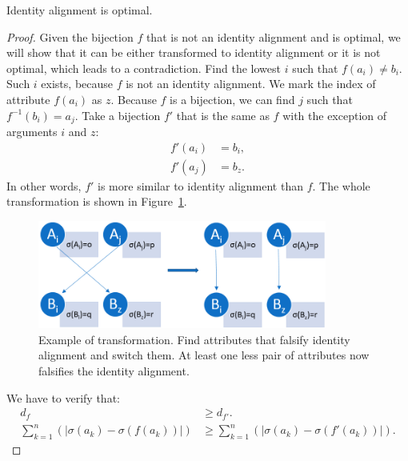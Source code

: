 \begin{theorem}
\label{mainproof}
Identity alignment is optimal.
\end{theorem}
\begin{proof}
Given the bijection $f$ that is not an identity alignment and is optimal, we will show that it can be either transformed to identity alignment or it is not optimal, which leads to a contradiction. Find the lowest $i$ such that $f(a_i)\neq b_i $. Such $i$ exists, because $f$ is not an identity alignment. We mark the index of attribute $f(a_i)$ as $z$. Because $f$ is a bijection, we can find $j$ such that $f^{-1}(b_i)=a_j$. Take a bijection $f'$ that is the same as $f$ with the exception of arguments $i$ and $z$:
 \begin{eqnarray}
    f'(a_i)&=b_i, \nonumber \\
    f'(a_j)&=b_z.
    \end{eqnarray}
In other words, $f'$ is more similar to identity alignment than $f$. The whole transformation is shown in Figure~\ref{fig:transformation}. 
\begin{figure}	
		\includegraphics[width=9.5cm]{Images/transformation.png}
		\centering
	\caption{Example of transformation. Find attributes that falsify identity alignment and switch them. At least one less pair of attributes now falsifies the identity alignment.}	
	\label{fig:transformation}	
\end{figure} 

We have to verify that:
 \begin{align}
    d_f &\geq d_{f'}. \\
    \sum_{k=1}^{n}{(|\sigma(a_k)-\sigma(f(a_k))|)}     &\geq \sum_{k=1}^{n}{(|\sigma(a_k)-\sigma(f'(a_k))|)}.
    \end{align}
    

\end{proof}
